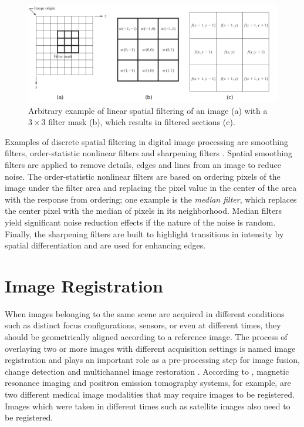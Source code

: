 \begin{figure}[htb]
	\centering
	\caption{\label{fig:generic_spatial_filtering} Arbitrary example of linear spatial filtering of an image (a) with a $3 \times 3$ filter mask (b), which results in filtered sections (c).} 
	\begin{center}
	    \includegraphics[scale=0.4]{images/generic_spatial_filtering.png}
	\end{center}
	\centering
\end{figure}

Examples of discrete spatial filtering in digital image processing are smoothing filters, order-statistic nonlinear filters and sharpening filters \cite{gonzalez2018digital}. Spatial smoothing filters are applied to remove details, edges and lines from an image to reduce noise. The order-statistic nonlinear filters are based on ordering pixels of the image under the filter area and replacing the pixel value in the center of the area with the response from ordering; one example is the \emph{median filter}, which replaces the center pixel with the median of pixels in its neighborhood. Median filters yield significant noise reduction effects if the nature of the noise is random. Finally, the sharpening filters are built to highlight transitions in intensity by spatial differentiation and are used for enhancing edges.

\section{Image Registration}

When images belonging to the same scene are acquired in different conditions such as distinct focus configurations, sensors, or even at different times, they should be geometrically aligned according to a reference image. The process of overlaying two or more images with different acquisition settings is named image registration and plays an important role as a pre-processing step for image fusion, change detection and multichannel image restoration \cite{zitova2003image}. According to , magnetic resonance imaging and positron emission tomography systems, for example, are two different medical image modalities that may require images to be registered. Images which were taken in different times such as satellite images also need to be registered.

